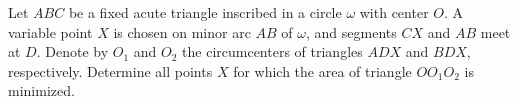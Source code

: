 Let $ABC$ be a fixed acute triangle inscribed in a circle $\omega$ with center $O$. A variable point $X$ is chosen on minor arc $AB$ of $\omega$, and segments $CX$ and $AB$ meet at $D$. Denote by $O_1$ and $O_2$ the circumcenters of triangles $ADX$ and $BDX$, respectively. Determine all points $X$ for which the area of triangle $OO_1O_2$ is minimized.